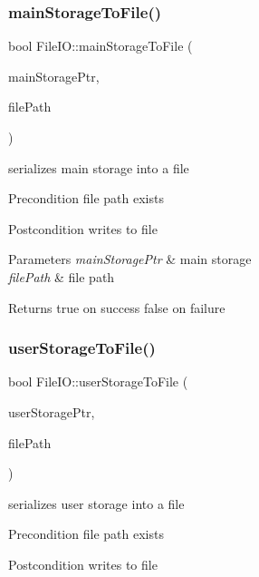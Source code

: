 \subsubsection{\texorpdfstring{main\+Storage\+To\+File()}{mainStorageToFile()}}
{\footnotesize\ttfamily bool File\+I\+O\+::main\+Storage\+To\+File (\begin{DoxyParamCaption}\item[{\hyperlink{class_main_storage}{Main\+Storage} $\ast$}]{main\+Storage\+Ptr,  }\item[{std\+::string}]{file\+Path }\end{DoxyParamCaption})}

serializes main storage into a file \begin{DoxyPrecond}{Precondition}
file path exists 
\end{DoxyPrecond}
\begin{DoxyPostcond}{Postcondition}
writes to file 
\end{DoxyPostcond}

\begin{DoxyParams}{Parameters}
{\em main\+Storage\+Ptr} & main storage \\
\hline
{\em file\+Path} & file path \\
\hline
\end{DoxyParams}
\begin{DoxyReturn}{Returns}
true on success false on failure 
\end{DoxyReturn}
\mbox{\label{class_file_i_o_af0529138b905a4fe9baea64556213d32}} 
\subsubsection{\texorpdfstring{user\+Storage\+To\+File()}{userStorageToFile()}}
{\footnotesize\ttfamily bool File\+I\+O\+::user\+Storage\+To\+File (\begin{DoxyParamCaption}\item[{\hyperlink{class_user_storage}{User\+Storage} $\ast$}]{user\+Storage\+Ptr,  }\item[{std\+::string}]{file\+Path }\end{DoxyParamCaption})}

serializes user storage into a file \begin{DoxyPrecond}{Precondition}
file path exists 
\end{DoxyPrecond}
\begin{DoxyPostcond}{Postcondition}
writes to file 
\end{DoxyPostcond}

